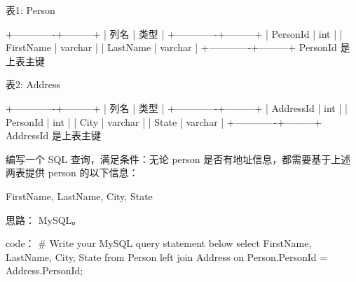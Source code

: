 表1: Person

+-------------+---------+
| 列名         | 类型     |
+-------------+---------+
| PersonId    | int     |
| FirstName   | varchar |
| LastName    | varchar |
+-------------+---------+
PersonId 是上表主键

表2: Address

+-------------+---------+
| 列名         | 类型    |
+-------------+---------+
| AddressId   | int     |
| PersonId    | int     |
| City        | varchar |
| State       | varchar |
+-------------+---------+
AddressId 是上表主键

 

编写一个 SQL 查询，满足条件：无论 person 是否有地址信息，都需要基于上述两表提供 person 的以下信息：

 

FirstName, LastName, City, State


































思路：
MySQL。


































code：
# Write your MySQL query statement below
select FirstName, LastName, City, State
from Person left join Address
on Person.PersonId = Address.PersonId;